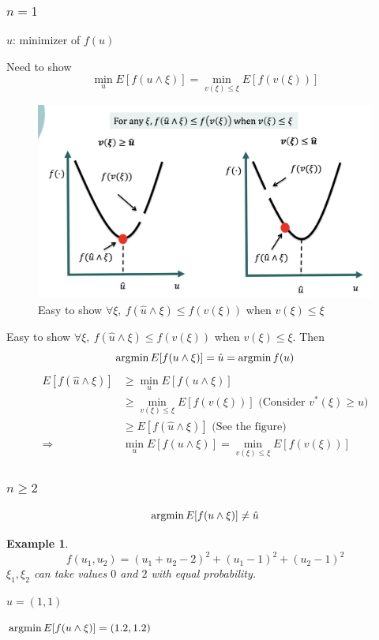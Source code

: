 \documentclass[11pt,a4paper]{article}
\newcommand{\argmin}{\operatornamewithlimits{argmin}}
\newtheorem{example}{Example}
\begin{document}
\subsubsection{$n=1$}
$\hat{u}$: minimizer of $f(u)$

Need to show $$\min_u E[f(u\wedge\xi)]=\min_{v(\xi)\leq \xi} E[f(v(\xi))]$$
\begin{center}\begin{figure}[htbp]
    \centering
    \includegraphics[scale=0.4]{leq.png}
    \caption{Easy to show $\forall \xi,\ f(\hat{u}\wedge\xi)\leq f(v(\xi))$ when $v(\xi)\leq \xi$}
    \label{}
\end{figure}\end{center}

Easy to show $\forall \xi,\ f(\hat{u}\wedge\xi)\leq f(v(\xi))$ when $v(\xi)\leq \xi$. Then $$\argmin E[f(u\wedge \xi)]=\hat{u}=\argmin f(u)$$
\begin{equation}
    \begin{aligned}
        E[f(\hat{u}\wedge\xi)]&\geq \min_uE[f(u\wedge\xi)]\\
        &\geq \min_{v(\xi)\leq \xi}E[f(v(\xi))]\text{ (Consider $v^*(\xi)\geq u$)}\\
        &\geq E[f(\hat{u}\wedge\xi)]\text{ (See the figure)}\\
        \Rightarrow	\quad &\min_u E[f(u\wedge\xi)]=\min_{v(\xi)\leq \xi} E[f(v(\xi))]
    \end{aligned}
    \nonumber
\end{equation}

\subsubsection{$n\geq 2$}
$$\argmin E[f(u\wedge \xi)]\neq \hat{u}$$
\begin{example}
$$f(u_1,u_2)=(u_1+u_2-2)^2+(u_1-1)^2+(u_2-1)^2$$
$\xi_1,\xi_2$ can take values $0$ and $2$ with equal probability.

$\hat{u}=(1,1)$

$\argmin E[f(u\wedge \xi)]=(1.2,1.2)$
\end{example}
\end{document}
